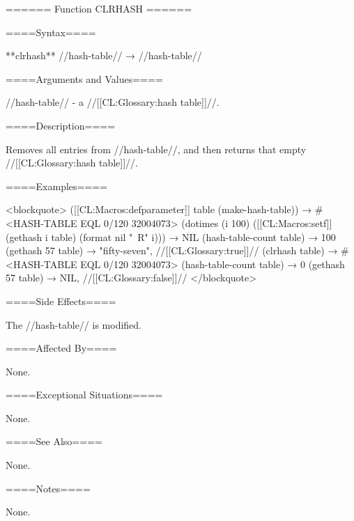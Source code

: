 ====== Function CLRHASH ======

====Syntax====

**clrhash** //hash-table// → //hash-table//

====Arguments and Values====

//hash-table// - a //[[CL:Glossary:hash table]]//.

====Description====

Removes all entries from //hash-table//, and then returns that empty //[[CL:Glossary:hash table]]//.

====Examples====

<blockquote> ([[CL:Macros:defparameter]] table (make-hash-table)) → #<HASH-TABLE EQL 0/120 32004073> (dotimes (i 100) ([[CL:Macros:setf]] (gethash i table) (format nil "~R" i))) → NIL (hash-table-count table) → 100 (gethash 57 table) → "fifty-seven", //[[CL:Glossary:true]]// (clrhash table) → #<HASH-TABLE EQL 0/120 32004073> (hash-table-count table) → 0 (gethash 57 table) → NIL, //[[CL:Glossary:false]]// </blockquote>

====Side Effects====

The //hash-table// is modified.

====Affected By====

None.

====Exceptional Situations====

None.

====See Also====

None.

====Notes====

None.

